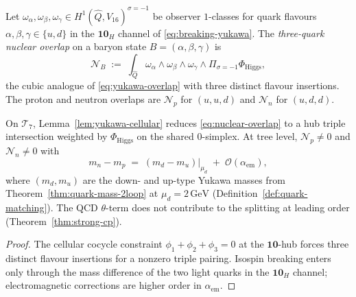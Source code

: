 \begin{definition}\label{def:nuclear-overlap}
Let $\omega_\alpha,\omega_\beta,\omega_\gamma\in
H^1(\hat Q,V_{16})^{\sigma=-1}$ be observer $1$-classes for quark flavours
$\alpha,\beta,\gamma\in\{u,d\}$ in the $\mathbf{10}_H$ channel of
\eqref{eq:breaking-yukawa}. The \emph{three-quark nuclear overlap} on a
baryon state $B=(\alpha,\beta,\gamma)$ is
\begin{equation}\label{eq:nuclear-overlap}
  \mathcal{N}_B
  \;:=\;
  \int_{\hat Q}
  \omega_\alpha\wedge\omega_\beta\wedge\omega_\gamma
  \wedge\Pi_{\sigma=-1}\Phi_{\mathrm{Higgs}},
\end{equation}
the cubic analogue of \eqref{eq:yukawa-overlap} with three distinct flavour
insertions. The proton and neutron overlaps are $\mathcal{N}_p$ for
$(u,u,d)$ and $\mathcal{N}_n$ for $(u,d,d)$.
\end{definition}

\begin{lemma}\label{lem:nuclear-cellular}
On $\mathcal{T}_7$, Lemma~\ref{lem:yukawa-cellular} reduces
\eqref{eq:nuclear-overlap} to a hub triple intersection weighted by
$\Phi_{\mathrm{Higgs}}$ on the shared $0$-simplex. At tree level,
$\mathcal{N}_p\neq 0$ and $\mathcal{N}_n\neq 0$ with
\begin{equation}\label{eq:isospin-split}
  m_n-m_p
  \;=\;
  (m_d-m_u)\Big|_{\mu_d}
  \;+\;
  \mathcal{O}(\alpha_{\mathrm{em}}),
\end{equation}
where $(m_d,m_u)$ are the down- and up-type Yukawa masses from
Theorem~\ref{thm:quark-mass-2loop} at $\mu_d=2\,\mathrm{GeV}$
(Definition~\ref{def:quark-matching}). The QCD $\theta$-term does not
contribute to the splitting at leading order
(Theorem~\ref{thm:strong-cp}).
\end{lemma}

\begin{proof}
The cellular cocycle constraint $\phi_1+\phi_2+\phi_3=0$ at the
$\mathbf{10}$-hub forces three distinct flavour insertions for a nonzero
triple pairing. Isospin breaking enters only through the mass difference of
the two light quarks in the $\mathbf{10}_H$ channel; electromagnetic
corrections are higher order in $\alpha_{\mathrm{em}}$.
\end{proof}

